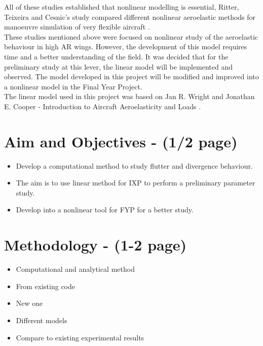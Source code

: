 \documentclass[11pt]{article}
\begin{document}
All of these studies established that nonlinear modelling is essential, Ritter, Teixeira and Cesnic's study compared different nonlinear aeroelastic methods for manoeuvre simulation of very flexible aircraft \cite{Ritter2018ComparisonAircraft}.\\

These studies mentioned above were focused on nonlinear study of the aeroelastic behaviour in high AR wings. However, the development of this model requires time and a better understanding of the field. It was decided that for the preliminary study at this lever, the linear model will be implemented and observed. The model developed in this project will be modified and improved into a nonlinear model in the Final Year Project.\\

The linear model used in this project was based on Jan R. Wright and Jonathan E. Cooper - Introduction to Aircraft Aeroelasticity and Loads \cite{Wright2015INTRODUCTIONLOADS}. 


\section{Aim and Objectives - (1/2 page)}
\begin{itemize}
    \item Develop a computational method to study flutter and divergence behaviour.
    \item The aim is to use linear method for IXP to perform a preliminary parameter study.
    \item Develop into a nonlinear tool for FYP for a better study.
\end{itemize}

\section{Methodology - (1-2 page)}
\begin{itemize}
    \item Computational and analytical method
    \item From existing code
    \item New one
    \item Different models
    \item Compare to existing experimental results
\end{itemize}

\end{document}
